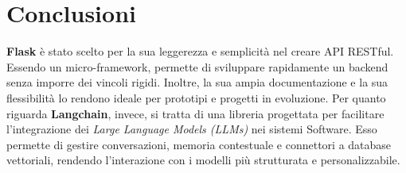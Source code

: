 \documentclass{article}
\begin{document}
\section{Conclusioni}
\textbf{Flask} è stato scelto per la sua leggerezza e semplicità nel creare 
API RESTful. Essendo un micro-framework, permette di sviluppare 
rapidamente un backend senza imporre dei vincoli rigidi. 
Inoltre, la sua ampia documentazione e la sua flessibilità lo rendono 
ideale per prototipi e progetti in evoluzione.
Per quanto riguarda \textbf{Langchain}, invece, si tratta di una libreria
progettata per facilitare l'integrazione dei \textit{Large Language Models (LLMs)}
nei sistemi Software. Esso permette di gestire conversazioni, memoria
contestuale e connettori a database vettoriali, rendendo l'interazione 
con i modelli più strutturata e personalizzabile.
\end{document}
